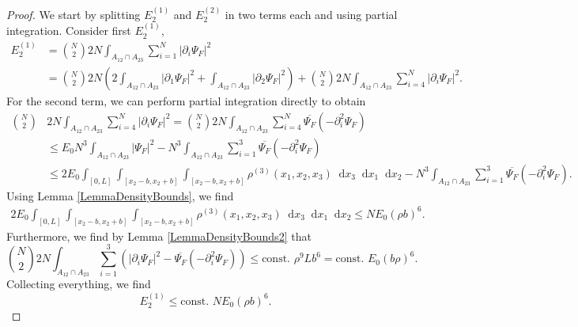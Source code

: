 \documentclass[a4paper,11pt]{article}
\newcommand{\abs}[1]{\left\lvert #1 \right\rvert}
\newcommand*\diff{\mathop{}\!\mathrm{d}}
\numberwithin{equation}{section}
\begin{document}
		\begin{proof}
		We start by splitting $ E_2^{(1)} $ and $ E_2^{(2)} $ in two terms each and using partial integration. Consider first $ E_2^{(1)} $,  
		\begin{equation}
		\begin{aligned}
		E_2^{(1)}&=\binom{N}{2}2N\int_{A_{12}\cap A_{23}}\sum_{i=1}^{N}\abs{\partial_i\Psi_F}^2\\
		&=\binom{N}{2}2N\left(2\int_{A_{12}\cap A_{23}}\abs{\partial_1\Psi_F}^2+\int_{A_{12}\cap A_{23}}\abs{\partial_2\Psi_F}^2\right)+\binom{N}{2}2N\int_{A_{12}\cap A_{23}}\sum_{i=4}^{N}\abs{\partial_i\Psi_F}^2.
		\end{aligned}
		\end{equation}
		For the second term, we can perform partial integration directly to obtain \begin{equation}
		\begin{aligned}
		\binom{N}{2}&2N\int_{A_{12}\cap A_{23}}\sum_{i=4}^{N}\abs{\partial_i\Psi_F}^2=\binom{N}{2}2N\int_{A_{12}\cap A_{23}}\sum_{i=4}^{N}\overline{\Psi_F}(-\partial^2_i\Psi_F)\\
		&\leq E_0 N^3\int_{A_{12}\cap A_{23}}\abs{\Psi_F}^2-N^3\int_{A_{12}\cap A_{23}}\sum_{i=1}^{3}\overline{\Psi_F}(-\partial^2_i\Psi_F)\\&\leq 2E_0\int_{[0,L]}\int_{[x_2-b,x_2+b]}\int_{[x_2-b,x_2+b]}\rho^{(3)}(x_1,x_2,x_3)\diff x_3\diff x_1\diff x_2-N^3\int_{A_{12}\cap A_{23}}\sum_{i=1}^{3}\overline{\Psi_F}(-\partial^2_i\Psi_F).
		\end{aligned}
		\end{equation}
		Using Lemma \ref{LemmaDensityBounds}, we find \begin{equation}
		\begin{aligned}
		2E_0\int_{[0,L]}\int_{[x_2-b,x_2+b]}\int_{[x_2-b,x_2+b]}\rho^{(3)}(x_1,x_2,x_3)\diff x_3\diff x_1\diff x_2\leq NE_0(\rho b)^6.
		\end{aligned}
		\end{equation}
		Furthermore, we find by Lemma \ref{LemmaDensityBounds2} that \begin{equation}
		\binom{N}{2}2N\int_{A_{12}\cap A_{23}}\sum_{i=1}^{3}\left(\abs{\partial_i\Psi_F}^2-\overline{\Psi_F}(-\partial^2_i\Psi_F)\right)\leq \text{const. }\rho^9 L b^6=\text{const. }E_0 (b\rho)^6.
		\end{equation}
		Collecting everything, we find \begin{equation}
		E_2^{(1)}\leq \text{const. }NE_0(\rho b)^6.
		\end{equation}

\end{proof}
\end{document}
